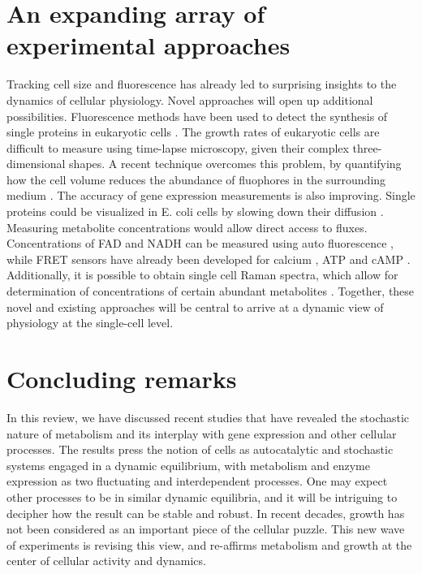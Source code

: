\section{An expanding array of experimental approaches}
Tracking cell size and fluorescence has already led to surprising insights to the dynamics of cellular physiology. Novel approaches will open up additional possibilities.  Fluorescence methods have been used to detect the synthesis of single proteins in eukaryotic cells \cite{Morisaki2016}. The growth rates of eukaryotic cells are difficult to measure using time-lapse microscopy, given their complex three-dimensional shapes. A recent technique overcomes this problem, by quantifying how the cell volume reduces the abundance of fluophores in the surrounding medium \cite{Cadart2017}. The accuracy of gene expression measurements is also improving. Single proteins could be visualized in E. coli cells by slowing down their diffusion \cite{Okumus2016}. Measuring metabolite concentrations would allow direct access to fluxes. Concentrations of FAD and NADH can be measured using auto fluorescence \cite{Georgakoudi2012, Gustavsson2015}, while FRET sensors have already been developed for calcium \cite{Nakai2001, Nagai2001}, ATP \cite{Yaginuma2014, Imamura2009} and cAMP \cite{Klarenbeek2015}. Additionally, it is possible to obtain single cell Raman spectra, which allow for determination of concentrations of certain abundant metabolites \cite{Yue2016}. Together, these novel and existing approaches will be central to arrive at a dynamic view of physiology at the single-cell level.  

\section{Concluding remarks}
In this review, we have discussed recent studies that have revealed the stochastic nature of metabolism and its interplay with gene expression and other cellular processes. The results press the notion of cells as autocatalytic and stochastic systems engaged in a dynamic equilibrium, with metabolism and enzyme expression as two fluctuating and interdependent processes.  One may expect other processes to be in similar dynamic equilibria, and it will be intriguing to decipher how the result can be stable and robust. In recent decades, growth has not been considered as an important piece of the cellular puzzle. This new wave of experiments is revising this view, and re-affirms metabolism and growth at the center of cellular activity and dynamics. 




